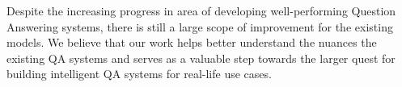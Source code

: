 Despite the increasing progress in area of developing well-performing Question Answering systems, there is still a large scope of improvement for the existing models. We believe that our work helps better understand the nuances the existing QA systems and serves as a valuable step towards the larger quest for building intelligent QA systems for real-life use cases.

